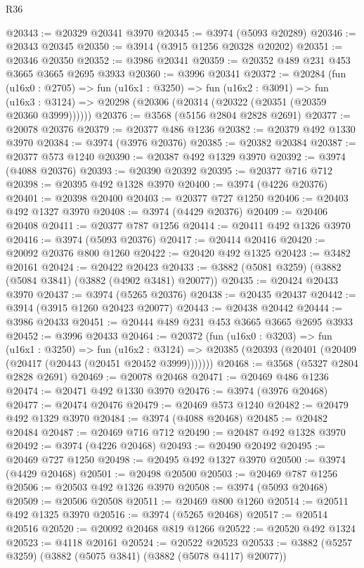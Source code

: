 \begin{lexlean}{R36}
\begin{coremodule}
@20343 := @20329 @20341 @3970
@20345 := @3974 (@5093 @20289)
@20346 := @20343 @20345
@20350 := @3914 (@3915 @1256 @20328 @20202)
@20351 := @20346 @20350
@20352 := @3986 @20341
@20359 := @20352 @489 @231 @453 @3665 @3665 @2695 @3933
@20360 := @3996 @20341
@20372 := @20284
    (fun (u16x0 : @2705) =>
    fun (u16x1 : @3250) =>
    fun (u16x2 : @3091) =>
    fun (u16x3 : @3124) => @20298 (@20306 (@20314 (@20322 (@20351 (@20359 @20360 @3999))))))
@20376 := @3568 (@5156 @2804 @2828 @2691)
@20377 := @20078 @20376
@20379 := @20377 @486 @1236
@20382 := @20379 @492 @1330 @3970
@20384 := @3974 (@3976 @20376)
@20385 := @20382 @20384
@20387 := @20377 @573 @1240
@20390 := @20387 @492 @1329 @3970
@20392 := @3974 (@4088 @20376)
@20393 := @20390 @20392
@20395 := @20377 @716 @712
@20398 := @20395 @492 @1328 @3970
@20400 := @3974 (@4226 @20376)
@20401 := @20398 @20400
@20403 := @20377 @727 @1250
@20406 := @20403 @492 @1327 @3970
@20408 := @3974 (@4429 @20376)
@20409 := @20406 @20408
@20411 := @20377 @787 @1256
@20414 := @20411 @492 @1326 @3970
@20416 := @3974 (@5093 @20376)
@20417 := @20414 @20416
@20420 := @20092 @20376 @800 @1260
@20422 := @20420 @492 @1325
@20423 := @3482 @20161
@20424 := @20422 @20423
@20433 := @3882 (@5081 @3259) (@3882 (@5084 @3841) (@3882 (@4902 @3481) @20077))
@20435 := @20424 @20433 @3970
@20437 := @3974 (@5265 @20376)
@20438 := @20435 @20437
@20442 := @3914 (@3915 @1260 @20423 @20077)
@20443 := @20438 @20442
@20444 := @3986 @20433
@20451 := @20444 @489 @231 @453 @3665 @3665 @2695 @3933
@20452 := @3996 @20433
@20464 := @20372
    (fun (u16x0 : @3203) =>
    fun (u16x1 : @3250) =>
    fun (u16x2 : @3124) =>
    @20385 (@20393 (@20401 (@20409 (@20417 (@20443 (@20451 @20452 @3999)))))))
@20468 := @3568 (@5327 @2804 @2828 @2691)
@20469 := @20078 @20468
@20471 := @20469 @486 @1236
@20474 := @20471 @492 @1330 @3970
@20476 := @3974 (@3976 @20468)
@20477 := @20474 @20476
@20479 := @20469 @573 @1240
@20482 := @20479 @492 @1329 @3970
@20484 := @3974 (@4088 @20468)
@20485 := @20482 @20484
@20487 := @20469 @716 @712
@20490 := @20487 @492 @1328 @3970
@20492 := @3974 (@4226 @20468)
@20493 := @20490 @20492
@20495 := @20469 @727 @1250
@20498 := @20495 @492 @1327 @3970
@20500 := @3974 (@4429 @20468)
@20501 := @20498 @20500
@20503 := @20469 @787 @1256
@20506 := @20503 @492 @1326 @3970
@20508 := @3974 (@5093 @20468)
@20509 := @20506 @20508
@20511 := @20469 @800 @1260
@20514 := @20511 @492 @1325 @3970
@20516 := @3974 (@5265 @20468)
@20517 := @20514 @20516
@20520 := @20092 @20468 @819 @1266
@20522 := @20520 @492 @1324
@20523 := @4118 @20161
@20524 := @20522 @20523
@20533 := @3882 (@5257 @3259) (@3882 (@5075 @3841) (@3882 (@5078 @4117) @20077))

\end{coremodule}
\end{lexlean}
